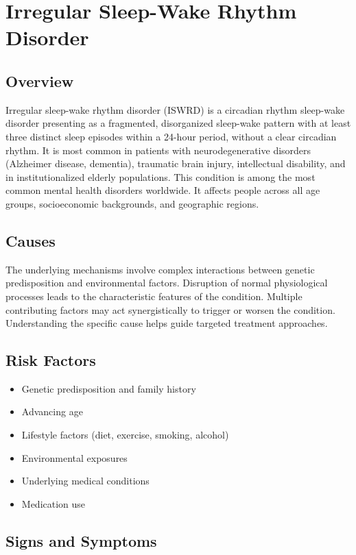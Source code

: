 \chapter{Irregular Sleep-Wake Rhythm Disorder}
\label{sec:Irregular Sleep-Wake Rhythm Disorder}

\section{Overview}
Irregular sleep-wake rhythm disorder (ISWRD) is a circadian rhythm sleep-wake disorder presenting as a fragmented, disorganized sleep-wake pattern with at least three distinct sleep episodes within a 24-hour period, without a clear circadian rhythm. It is most common in patients with neurodegenerative disorders (Alzheimer disease, dementia), traumatic brain injury, intellectual disability, and in institutionalized elderly populations. This condition is among the most common mental health disorders worldwide. It affects people across all age groups, socioeconomic backgrounds, and geographic regions.
\section{Causes}
The underlying mechanisms involve complex interactions between genetic predisposition and environmental factors. Disruption of normal physiological processes leads to the characteristic features of the condition. Multiple contributing factors may act synergistically to trigger or worsen the condition. Understanding the specific cause helps guide targeted treatment approaches.
\section{Risk Factors}


\begin{itemize}[noitemsep]
  \item Genetic predisposition and family history
  \item Advancing age
  \item Lifestyle factors (diet, exercise, smoking, alcohol)
  \item Environmental exposures
  \item Underlying medical conditions
  \item Medication use
\end{itemize}
\section{Signs and Symptoms}

